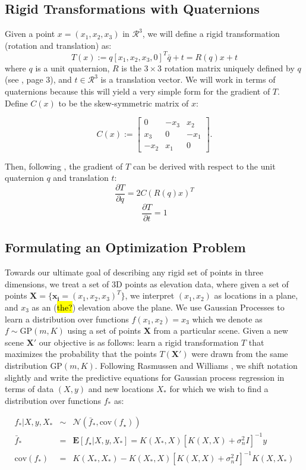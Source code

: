\documentclass{article} %
\begin{document}
\subsection{Rigid Transformations with Quaternions}
Given a point $x = (x_1,x_2,x_3)$ in $\mathcal{R}^3$, we will define a rigid transformation (rotation and translation) as:
$$T(x) := q [x_1, x_2, x_3, 0]^T \bar q +t = R(q) x + t$$ where $q$ is a unit quaternion, $R$ is the $3 \times 3$ rotation matrix uniquely defined by $q$ (see \cite{wheeler1995}, page 3), and $t \in \mathcal{R}^3$ is a translation vector. We will work in terms of quaternions because this will yield a very simple form for the gradient of $T$. Define $C(x)$ to be the skew-symmetric matrix of $x$:

$$C(x) := \left[ \begin{array}{ccc}
0 & -x_3 & x_2 \\
x_3 & 0 & -x_1 \\
-x_2 & x_1 & 0 \end{array} \right].$$

Then, following \cite{wheeler1995}, the gradient of $T$ can be derived with respect to the unit quaternion $q$ and translation $t$:
$$\frac{\partial T}{\partial q}= 2C(R(q)x)^T$$
$$\frac{\partial T}{\partial t}= 1$$

\subsection{Formulating an Optimization Problem}
Towards our ultimate goal of describing any rigid set of points in three dimensions, we treat a set of 3D points as elevation data, where given a set of points $\mathbf{X} = \{\mathbf{x_i} = (x_1,x_2,x_3)^{T}\}$, we interpret $(x_1,x_2)$ as locations in a plane, and $x_3$ as an (\hl{the?}) elevation above the plane. We use Gaussian Processes to learn a distribution over functions $f(x_1,x_2) = x_3$ which we denote as $f \sim \mbox{GP}(m,K)$ using a set of points $\mathbf{X}$ from a particular scene. Given a new scene $\mathbf{X'}$ our objective is as follows: learn a rigid transformation $T$ that maximizes the probability that the points $T(\mathbf{X'})$ were drawn from the same distribution $\mbox{GP}(m,K)$. Following Rasmussen and Williams \cite{rasmussen2006gaussian}, we shift notation slightly and write the predictive equations for Gaussian process regression in terms of data $(X,y)$ and new locations $X_{*}$ for which we wish to find a distribution over functions $f_{*}$ as:

\begin{eqnarray}
f_{*} | X, y, X_{*} &\sim& \mathcal{N}(\bar f_{*}, \mbox{cov}(f_{\star})) \\
\bar f_{*} &=& \mathbf{E}[f_\star | X,y,X_{*}] = K(X_{*},X)[K(X,X) + \sigma_n^2 I]^{-1} y \\
\mbox{cov}(f_{*}) &=& K(X_{*},X_*) - K(X_*,X)[K(X,X) + \sigma_n^2 I]^{-1} K(X,X_*)
\end{eqnarray}
\end{document}
